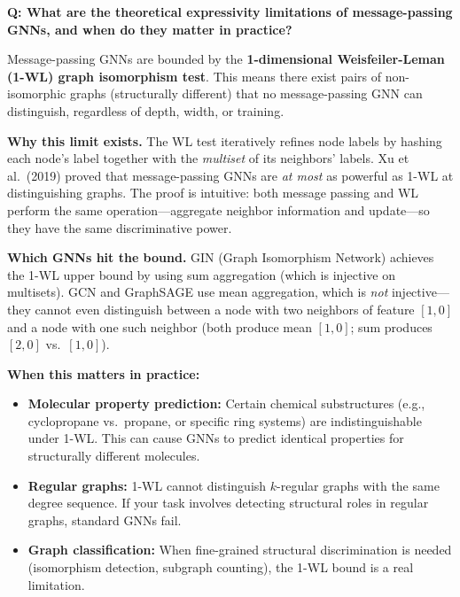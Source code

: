\begin{interviewq}
\textbf{Q: What are the theoretical expressivity limitations of message-passing GNNs, and when do they matter in practice?}

 \quad {} \quad \badgefreq{\freqlow}

\stronganswer

Message-passing GNNs are bounded by the \textbf{1-dimensional Weisfeiler-Leman (1-WL) graph isomorphism test}. This means there exist pairs of non-isomorphic graphs (structurally different) that no message-passing GNN can distinguish, regardless of depth, width, or training.

\textbf{Why this limit exists.} The WL test iteratively refines node labels by hashing each node's label together with the \textit{multiset} of its neighbors' labels. Xu et al.\ (2019) proved that message-passing GNNs are \textit{at most} as powerful as 1-WL at distinguishing graphs. The proof is intuitive: both message passing and WL perform the same operation---aggregate neighbor information and update---so they have the same discriminative power.

\textbf{Which GNNs hit the bound.} GIN (Graph Isomorphism Network) achieves the 1-WL upper bound by using sum aggregation (which is injective on multisets). GCN and GraphSAGE use mean aggregation, which is \textit{not} injective---they cannot even distinguish between a node with two neighbors of feature $[1, 0]$ and a node with one such neighbor (both produce mean $[1, 0]$; sum produces $[2, 0]$ vs.\ $[1, 0]$).

\textbf{When this matters in practice:}
\begin{itemize}
    \item \textbf{Molecular property prediction:} Certain chemical substructures (e.g., cyclopropane vs.\ propane, or specific ring systems) are indistinguishable under 1-WL. This can cause GNNs to predict identical properties for structurally different molecules.
    \item \textbf{Regular graphs:} 1-WL cannot distinguish $k$-regular graphs with the same degree sequence. If your task involves detecting structural roles in regular graphs, standard GNNs fail.
    \item \textbf{Graph classification:} When fine-grained structural discrimination is needed (isomorphism detection, subgraph counting), the 1-WL bound is a real limitation.
\end{itemize}


\end{interviewq}
